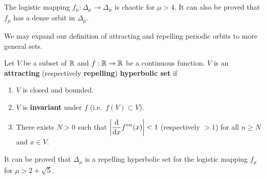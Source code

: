 \begin{egg}
The logistic mapping $f_{\mu}: \Delta_\mu\to \Delta_\mu$ is chaotic
for $\mu > 4$.  It can also be proved that $f_\mu$ has a dense orbit in
$\Delta_\mu$.
\end{egg}

We may expand our definition of attracting and repelling periodic
orbits to more general sets.

\begin{defn}
Let $V$ be a subset of $\RR$ and $f:\RR\rightarrow \RR$ be a
continuous function.  $V$ is an
{\bfseries attracting}
(respectively {\bfseries repelling})
{\bfseries hyperbolic set} if
\begin{enumerate}
\item $V$ is closed and bounded.
\item $V$ is {\bfseries invariant} under $f$
(i.e.\ $f(V) \subset V$).
\item There exists $N>0$ such that
$\DS \left| \dfdx{f^{\circ n}}{x}(x)  \right| < 1$
(respectively $>1$) for all $n \geq N$ and $x \in V$.
\end{enumerate}
\end{defn}

\begin{egg}
It can be proved that $\Delta_\mu$ is a repelling hyperbolic set for
the logistic mapping $f_\mu$ for $\mu>2+\sqrt{5}$. 
\end{egg}

